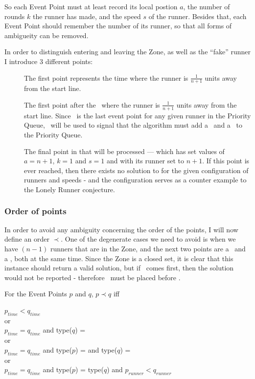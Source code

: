 So each Event Point must at least record its local postion $a$, the number of rounds $k$ the runner has made, and the speed $s$ of the runner. Besides that, each Event Point should remember the number of its runner, so that all forms of ambigueity can be removed.

In order to distinguish entering and leaving the Zone, as well as the ``fake'' runner I introduce 3 different points:
\begin{description}
\item[\comStart] The first point represents the time where the runner is $\frac{1}{n + 1}$ units away from the start line.
\item[\comEnd] The first point after the \comStart\, where the runner is $\frac{1}{n + 1}$ units away from the start line. Since \comEnd\, is the last event point for any given runner in the Priority Queue, \comEnd\, will be used to signal that the algorithm must add a \comStart\, and a \comEnd\ to the Priority Queue.
\item[\comFin] The final point in that will be processed --- which has set values of $a = n+1$, $k = 1$ and $s = 1$ and with its runner set to $n+1$. If this point is ever reached, then there exists no solution to  for the given configuration of runners and speeds - and the configuration serves as a counter example to the Lonely Runner conjecture.
\end{description}

\subsubsection{Order of points}
\label{order}
In order to avoid any ambiguity concerning the order of the points, I will now define an order $\prec$. One of the degenerate cases we need to avoid is when we have $(n-1)$ runners that are in the Zone, and the next two points are a \comEnd\, and a \comStart, both at the same time. Since the Zone is a closed set, it is clear that this instance should return a valid solution, but if \comEnd\, comes first, then the solution would not be reported - therefore \comStart\, must be placed before \comEnd.

\begin{defi}
For the Event Points $p$ and $q$, $p \prec q$ iff
\begin{center}
\label{orderOfPoints}
$p_{time} < q_{time}$\\
or \\
$p_{time} = q_{time}$ and type($q$) = \comFin\\
or \\
$p_{time} = q_{time}$ and type($p$) = \comStart and type($q$) = \comEnd \\
or \\
$p_{time} = q_{time}$ and type($p$) = type($q$) and $p_{runner} < q_{runner}$
\end{center}
\end{defi}


